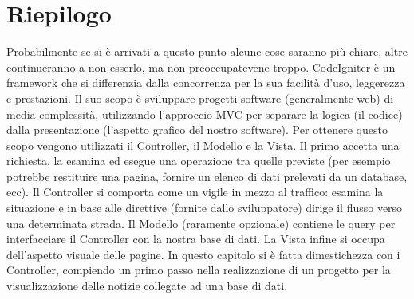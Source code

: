\section*{Riepilogo}
Probabilmente se si è arrivati a questo punto alcune cose saranno più chiare, altre continueranno a non esserlo, ma non preoccupatevene troppo. CodeIgniter è un framework che si differenzia dalla concorrenza per la sua facilità d'uso, leggerezza e prestazioni. Il suo scopo è sviluppare progetti software (generalmente web) di media complessità, utilizzando l'approccio \ac{MVC} per separare la logica (il codice) dalla presentazione (l'aspetto grafico del nostro software). Per ottenere questo scopo vengono utilizzati il Controller, il Modello e la Vista. Il primo accetta una richiesta, la esamina ed esegue una operazione tra quelle previste (per esempio potrebbe restituire una pagina, fornire un elenco di dati prelevati da un database, ecc). Il Controller si comporta come un vigile in mezzo al traffico: esamina la situazione e in base alle direttive (fornite dallo sviluppatore) dirige il flusso verso una determinata strada. Il Modello (raramente opzionale) contiene le query per interfacciare il Controller con la nostra base di dati. La Vista infine si occupa dell'aspetto visuale delle pagine. In questo capitolo si è fatta dimestichezza con i Controller, compiendo un primo passo nella realizzazione di un progetto per la visualizzazione delle notizie collegate ad una base di dati. 